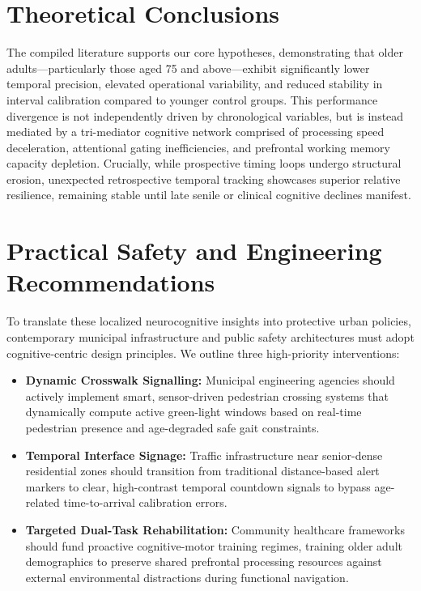 \documentclass{custom_report}
\begin{document}
\section{Theoretical Conclusions}
The compiled literature supports our core hypotheses, demonstrating that older adults—particularly those aged 75 and above—exhibit significantly lower temporal precision, elevated operational variability, and reduced stability in interval calibration compared to younger control groups. This performance divergence is not independently driven by chronological variables, but is instead mediated by a tri-mediator cognitive network comprised of processing speed deceleration, attentional gating inefficiencies, and prefrontal working memory capacity depletion. Crucially, while prospective timing loops undergo structural erosion, unexpected retrospective temporal tracking showcases superior relative resilience, remaining stable until late senile or clinical cognitive declines manifest.

\section{Practical Safety and Engineering Recommendations}
To translate these localized neurocognitive insights into protective urban policies, contemporary municipal infrastructure and public safety architectures must adopt cognitive-centric design principles. We outline three high-priority interventions:
\begin{itemize}
    \item \textbf{Dynamic Crosswalk Signalling:} Municipal engineering agencies should actively implement smart, sensor-driven pedestrian crossing systems that dynamically compute active green-light windows based on real-time pedestrian presence and age-degraded safe gait constraints.
    \item \textbf{Temporal Interface Signage:} Traffic infrastructure near senior-dense residential zones should transition from traditional distance-based alert markers to clear, high-contrast temporal countdown signals to bypass age-related time-to-arrival calibration errors.
    \item \textbf{Targeted Dual-Task Rehabilitation:} Community healthcare frameworks should fund proactive cognitive-motor training regimes, training older adult demographics to preserve shared prefrontal processing resources against external environmental distractions during functional navigation.
\end{itemize}
\end{document}
